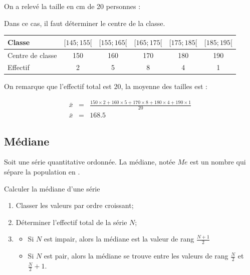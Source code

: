 \documentclass[12pt,a4paper]{article}
\begin{document}
	\begin{myex}
		On a relevé la taille en cm de 20 personnes :
		
		Dans ce cas, il faut déterminer le centre de la classe.
		
		\begin{tabular}{|@{\ }l@{\ }|@{\ }c@{\ }|@{\ }c@{\ }|@{\ }c@{\ }|@{\ }c@{\ }|@{\ }c@{\ }|}
			\hline
			Classe           & $[145 ; 155[$ & $[155 ; 165[$ & $[165 ; 175[$ & $[175 ; 185[$ & $[185 ; 195[$ \\ \hline
			Centre de classe & 150           & 160           & 170           & 180           & 190           \\ \hline
			Effectif         & 2             & 5             & 8             & 4             & 1            \\ \hline
		\end{tabular}
	
	\vspace*{0.5cm}
	
	On remarque que l'effectif total est 20, la moyenne des tailles est :
	
	\begin{eqnarray*}
		\bar{x} &=& \frac{150 \times 2 + 160 \times 5 + 170 \times 8 + 180 \times 4 + 190 \times 1}{20}\\
		\bar{x} &=& \num{168.5}
	\end{eqnarray*}
	\end{myex}

\subsection{Médiane}

\begin{mydef}
	Soit une série quantitative ordonnée. La médiane, notée $Me$ est un nombre qui sépare la population en . 
\end{mydef}

\begin{mymeth}{Calculer la médiane d'une série}
	\begin{enumerate}
		\item Classer les valeurs par ordre croissant;
		\item Déterminer l'effectif total de la série $N$;
		\item 
			\begin{itemize}
				\item Si $N$ est impair, alors la médiane est la valeur de rang $\frac{N + 1}{2}$
				\item Si $N$ est pair, alors la médiane se trouve entre les valeurs de rang $\frac{N}{2}$ et $\frac{N}{2}+1$.
			\end{itemize} 
		
	\end{enumerate}
\end{mymeth}
\end{document}
